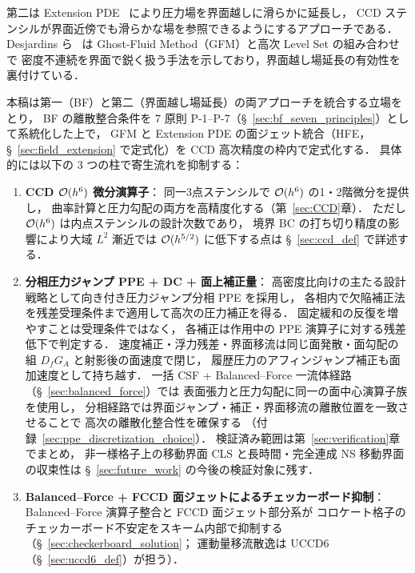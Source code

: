 第二は Extension PDE~\cite{Aslam2004} により圧力場を界面越しに滑らかに延長し，
CCD ステンシルが界面近傍でも滑らかな場を参照できるようにするアプローチである．
Desjardins ら~\cite{Desjardins2008} は Ghost-Fluid Method（GFM）と高次 Level Set の組み合わせで
密度不連続を界面で鋭く扱う手法を示しており，界面越し場延長の有効性を裏付けている．

本稿は第一（BF）と第二（界面越し場延長）の両アプローチを統合する立場をとり，
BF の離散整合条件を 7 原則 P-1--P-7（§~\ref{sec:bf_seven_principles}）として系統化した上で，
GFM と Extension PDE の面ジェット統合（HFE，§~\ref{sec:field_extension} で定式化）を CCD 高次精度の枠内で定式化する．
具体的には以下の 3 つの柱で寄生流れを抑制する：
\begin{enumerate}[noitemsep]
  \item \textbf{CCD $\mathcal{O}(h^6)$ 微分演算子}：
        同一3点ステンシルで $\mathcal{O}(h^6)$ の1・2階微分を提供し，
        曲率計算と圧力勾配の両方を高精度化する（第~\ref{sec:CCD}章）．
        ただし $\mathcal{O}(h^6)$ は内点ステンシルの設計次数であり，
        境界 BC の打ち切り精度の影響により大域 $L^2$ 漸近では $\mathcal{O}(h^{5/2})$ に低下する点は §~\ref{sec:ccd_def} で詳述する．
  \item \textbf{分相圧力ジャンプ PPE + DC + 面上補正量}：
        高密度比向けの主たる設計戦略として向き付き圧力ジャンプ分相 PPE を採用し，
        各相内で欠陥補正法を残差受理条件まで適用して高次の圧力補正を得る．
        固定緩和の反復を増やすことは受理条件ではなく，
        各補正は作用中の PPE 演算子に対する残差低下で判定する．
        速度補正・浮力残差・界面移流は同じ面発散・面勾配の組
        $D_fG_A$ と射影後の面速度で閉じ，
        履歴圧力のアフィンジャンプ補正も面加速度として持ち越す．
        一括 CSF + Balanced--Force 一流体経路（§~\ref{sec:balanced_force}）では
        表面張力と圧力勾配に同一の面中心演算子族を使用し，
        分相経路では界面ジャンプ・補正・界面移流の離散位置を一致させることで
        高次の離散化整合性を確保する
        （付録~\ref{sec:ppe_discretization_choice}）．
        検証済み範囲は第~\ref{sec:verification}章でまとめ，
        非一様格子上の移動界面 CLS と長時間・完全連成 NS 移動界面の収束性は
        §~\ref{sec:future_work} の今後の検証対象に残す．
  \item \textbf{Balanced--Force + FCCD 面ジェットによるチェッカーボード抑制}：
        Balanced--Force 演算子整合と FCCD 面ジェット部分系が
        コロケート格子のチェッカーボード不安定をスキーム内部で抑制する
        （§~\ref{sec:checkerboard_solution}；
        運動量移流散逸は UCCD6（§~\ref{sec:uccd6_def}）が担う）．
\end{enumerate}
